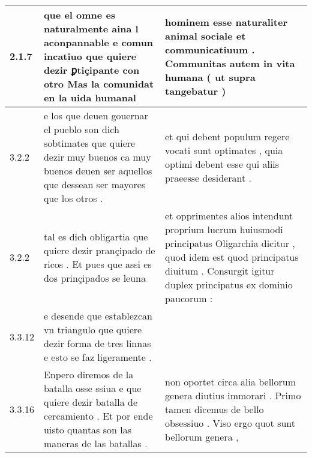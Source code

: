 \begin{tabular}{|p{1cm}|p{6.5cm}|p{6.5cm}|}
2.1.7 & que el omne es naturalmente aina l aconpannable e comun incatiuo que quiere dezir ꝑtiçipante con otro Mas la comunidat en la uida humanal & hominem esse naturaliter animal sociale et communicatiuum . Communitas autem in vita humana ( ut supra tangebatur ) \\\hline
3.2.2 & e los que deuen gouernar el pueblo son dich sobtimates que quiere dezir muy buenos ca muy buenos deuen ser aquellos que dessean ser mayores que los otros . & et qui debent populum regere vocati sunt optimates , quia optimi debent esse qui aliis praeesse desiderant . \\\hline
3.2.2 & tal es dich obligartia que quiere dezir prançipado de ricos . Et pues que assi es dos prinçipados se leuna & et opprimentes alios intendunt proprium lucrum huiusmodi principatus Oligarchia dicitur , quod idem est quod principatus diuitum . Consurgit igitur duplex principatus ex dominio paucorum : \\\hline
3.3.12 & e desende que establezcan vn triangulo que quiere dezir forma de tres linnas e esto se faz ligeramente . &  \\\hline
3.3.16 & Enpero diremos de la batalla osse ssiua e que quiere dezir batalla de cercamiento . Et por ende uisto quantas son las maneras de las batallas . & non oportet circa alia bellorum genera diutius immorari . Primo tamen dicemus de bello obsessiuo . Viso ergo quot sunt bellorum genera , \\\hline

\end{tabular}
